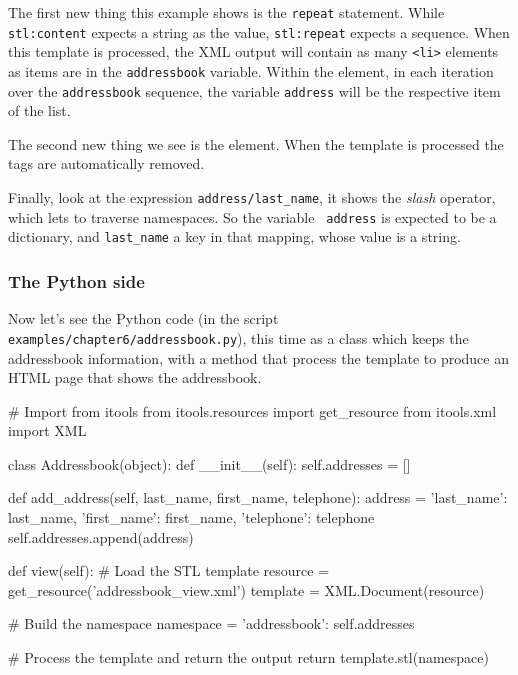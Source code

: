 The first new thing this example shows is the {\tt repeat} statement. While
{\tt stl:content} expects a string as the value, {\tt stl:repeat} expects
a sequence. When this template is processed, the XML output will contain as
many {\tt <li>} elements as items are in the {\tt addressbook} variable.
Within the element, in each iteration over the {\tt addressbook} sequence,
the variable {\tt address} will be the respective item of the list.

The second new thing we see is the {\tt <stl:block>} element. When the
template is processed the {\tt <stl:block>} tags are automatically
removed.

Finally, look at the expression {\tt address/last\_name}, it shows the {\em
slash} operator, which lets to traverse namespaces. So the variable {\tt
address} is expected to be a dictionary, and {\tt last\_name} a key in that
mapping, whose value is a string.

\subsubsection{The Python side}

Now let's see the Python code (in the script
{\tt examples/chapter6/addressbook.py}), this time as a class which keeps
the addressbook information, with a method that process the template to
produce an HTML page that shows the addressbook.

\begin{code}
    # Import from itools
    from itools.resources import get_resource
    from itools.xml import XML


    class Addressbook(object):
        def __init__(self):
            self.addresses = []


        def add_address(self, last_name, first_name, telephone):
            address = {'last_name': last_name,
                       'first_name': first_name,
                       'telephone': telephone}
            self.addresses.append(address)


        def view(self):
            # Load the STL template
            resource = get_resource('addressbook_view.xml')
            template = XML.Document(resource)

            # Build the namespace
            namespace = {'addressbook': self.addresses}

            # Process the template and return the output
            return template.stl(namespace)
\end{code}

